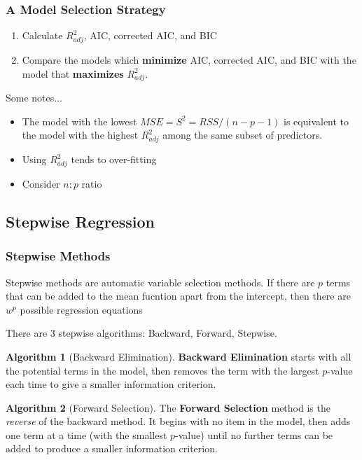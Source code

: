 \documentclass[11pt]{article}
\theoremstyle{definition}
\newtheorem{algorithm}{Algorithm}[section]
\numberwithin{equation}{section}
\begin{document}
\subsubsection{A Model Selection Strategy}

\begin{enumerate}
  \item Calculate $R^2_{adj}$, AIC, corrected AIC, and BIC
  \item Compare the models which \textbf{minimize} AIC, corrected AIC, and BIC with the model that \textbf{maximizes} $R^2_{adj}$.
\end{enumerate}
Some notes...
\begin{itemize}
  \item The model with the lowest $MSE = S^2 = RSS / (n - p - 1)$ is equivalent to the model with the highest $R^2_{adj}$ among the same subset of predictors.
  \item Using $R^2_{adj}$ tends to over-fitting
  \item Consider $n:p$ ratio
\end{itemize}

\subsection{Stepwise Regression}

\subsubsection{Stepwise Methods}

Stepwise methods are automatic variable selection methods. If there are $p$ terms that can be added to the mean fucntion apart from the intercept, then there are $w^p$ possible regression equations

There are 3 stepwise algorithms: Backward, Forward, Stepwise.

\begin{algorithm}[Backward Elimination]
  \textbf{Backward Elimination} starts with all the potential terms in the model, then removes the term with the largest $p$-value each time to give a smaller information criterion.
\end{algorithm}

\begin{algorithm}[Forward Selection]
 The \textbf{Forward Selection} method is the \textit{reverse} of the backward method. It begins with no item in the model, then adds one term at a time (with the smallest $p$-value) until no further terms can be added to produce a smaller information criterion.
\end{algorithm}
\end{document}
